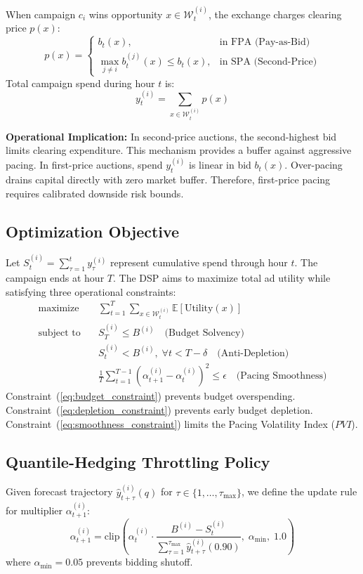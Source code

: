 \documentclass[sigconf]{acmart}
\begin{document}
When campaign $c_i$ wins opportunity $x \in \mathcal{W}_t^{(i)}$, the exchange charges clearing price $p(x)$:
\begin{equation}
  p(x) =
  \begin{cases}
    b_t(x), & \text{in FPA (Pay-as-Bid)} \\
    \max_{j \ne i} b_t^{(j)}(x) \le b_t(x), & \text{in SPA (Second-Price)}
  \end{cases}
\end{equation}
Total campaign spend during hour $t$ is:
\begin{equation}
  y_t^{(i)} = \sum_{x \in \mathcal{W}_t^{(i)}} p(x)
\end{equation}

\textbf{Operational Implication:} In second-price auctions, the second-highest bid limits clearing expenditure. This mechanism provides a buffer against aggressive pacing. In first-price auctions, spend $y_t^{(i)}$ is linear in bid $b_t(x)$. Over-pacing drains capital directly with zero market buffer. Therefore, first-price pacing requires calibrated downside risk bounds.

\subsection{Optimization Objective}
Let $S_t^{(i)} = \sum_{\tau=1}^t y_\tau^{(i)}$ represent cumulative spend through hour $t$. The campaign ends at hour $T$. The DSP aims to maximize total ad utility while satisfying three operational constraints:
\begin{align}
  \text{maximize} \quad & \sum_{t=1}^T \sum_{x \in \mathcal{W}_t^{(i)}} \mathbb{E}[\text{Utility}(x)] \\
  \text{subject to} \quad & S_T^{(i)} \le B^{(i)} \quad \text{(Budget Solvency)} \label{eq:budget_constraint} \\
  & S_t^{(i)} < B^{(i)}, \; \forall t < T - \delta \quad \text{(Anti-Depletion)} \label{eq:depletion_constraint} \\
  & \frac{1}{T}\sum_{t=1}^{T-1} (\alpha_{t+1}^{(i)} - \alpha_t^{(i)})^2 \le \epsilon \quad \text{(Pacing Smoothness)} \label{eq:smoothness_constraint}
\end{align}
Constraint~(\ref{eq:budget_constraint}) prevents budget overspending. Constraint~(\ref{eq:depletion_constraint}) prevents early budget depletion. Constraint~(\ref{eq:smoothness_constraint}) limits the Pacing Volatility Index ($PVI$).

\subsection{Quantile-Hedging Throttling Policy}
Given forecast trajectory $\hat{y}_{t+\tau}^{(i)}(q)$ for $\tau \in \{1, \dots, \tau_{\max}\}$, we define the update rule for multiplier $\alpha_{t+1}^{(i)}$:
\begin{equation}
  \alpha_{t+1}^{(i)} = \text{clip}\left(\alpha_t^{(i)} \cdot \frac{B^{(i)} - S_t^{(i)}}{\sum_{\tau=1}^{\tau_{\max}} \hat{y}_{t+\tau}^{(i)}(0.90)}, \; \alpha_{\min}, \; 1.0\right)
  \label{eq:pacing_policy}
\end{equation}
where $\alpha_{\min} = 0.05$ prevents bidding shutoff.
\end{document}
